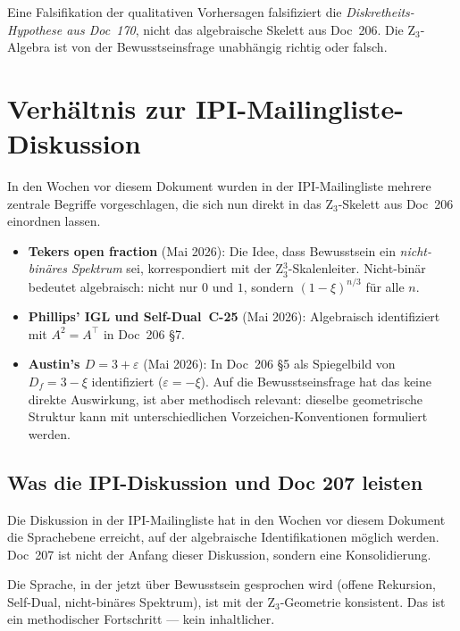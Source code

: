 \begin{interpretation}
Eine Falsifikation der qualitativen Vorhersagen falsifiziert die \emph{Diskretheits-Hypothese aus Doc~170}, nicht das algebraische Skelett aus Doc~206. Die Z$_3$-Algebra ist von der Bewusstseinsfrage unabhängig richtig oder falsch.
\end{interpretation}

\section{Verhältnis zur IPI-Mailingliste-Diskussion}\label{sec:ipi}

In den Wochen vor diesem Dokument wurden in der IPI-Mailingliste mehrere zentrale Begriffe vorgeschlagen, die sich nun direkt in das Z$_3$-Skelett aus Doc~206 einordnen lassen.

\begin{itemize}
\item \textbf{Tekers \glqq open fraction\grqq{}} (Mai 2026): Die Idee, dass Bewusstsein ein \emph{nicht-binäres Spektrum} sei, korrespondiert mit der Z$_3^3$-Skalenleiter. \glqq Nicht-binär\grqq{} bedeutet algebraisch: nicht nur $0$ und $1$, sondern $(1-\xi)^{n/3}$ für alle $n$.
\item \textbf{Phillips' IGL und Self-Dual~C-25} (Mai 2026): Algebraisch identifiziert mit $A^2 = A^\top$ in Doc~206 \S7.
\item \textbf{Austin's $D = 3 + \varepsilon$} (Mai 2026): In Doc~206 \S5 als Spiegelbild von $D_f = 3 - \xi$ identifiziert ($\varepsilon = -\xi$). Auf die Bewusstseinsfrage hat das keine direkte Auswirkung, ist aber methodisch relevant: dieselbe geometrische Struktur kann mit unterschiedlichen Vorzeichen-Konventionen formuliert werden.
\end{itemize}

\subsection{Was die IPI-Diskussion und Doc 207 leisten}

Die Diskussion in der IPI-Mailingliste hat in den Wochen vor diesem Dokument die Sprachebene erreicht, auf der algebraische Identifikationen möglich werden. Doc~207 ist nicht der Anfang dieser Diskussion, sondern eine Konsolidierung.

Die Sprache, in der jetzt über Bewusstsein gesprochen wird (offene Rekursion, Self-Dual, nicht-binäres Spektrum), ist mit der Z$_3$-Geometrie konsistent. Das ist ein methodischer Fortschritt — kein inhaltlicher.

